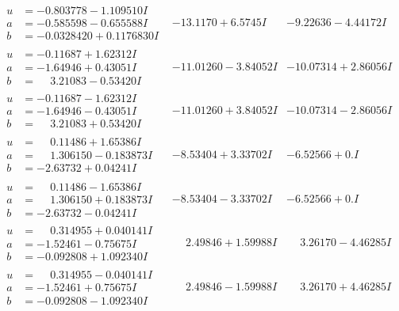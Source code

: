 \documentclass[1p]{elsarticle_modified}
\theoremstyle{definition}
\begin{document}
$$\begin{array}{c|c|c}
\begin{aligned}
u &= -0.803778 - 1.109510 I \\
a &= -0.585598 - 0.655588 I \\
b &= -0.0328420 + 0.1176830 I\end{aligned}
 & -13.1170 + 6.5745 I & -9.22636 - 4.44172 I \\ \hline\begin{aligned}
u &= -0.11687 + 1.62312 I \\
a &= -1.64946 + 0.43051 I \\
b &= \phantom{-}3.21083 - 0.53420 I\end{aligned}
 & -11.01260 - 3.84052 I & -10.07314 + 2.86056 I \\ \hline\begin{aligned}
u &= -0.11687 - 1.62312 I \\
a &= -1.64946 - 0.43051 I \\
b &= \phantom{-}3.21083 + 0.53420 I\end{aligned}
 & -11.01260 + 3.84052 I & -10.07314 - 2.86056 I \\ \hline\begin{aligned}
u &= \phantom{-}0.11486 + 1.65386 I \\
a &= \phantom{-}1.306150 - 0.183873 I \\
b &= -2.63732 + 0.04241 I\end{aligned}
 & -8.53404 + 3.33702 I & -6.52566 + 0. I\phantom{ +0.000000I} \\ \hline\begin{aligned}
u &= \phantom{-}0.11486 - 1.65386 I \\
a &= \phantom{-}1.306150 + 0.183873 I \\
b &= -2.63732 - 0.04241 I\end{aligned}
 & -8.53404 - 3.33702 I & -6.52566 + 0. I\phantom{ +0.000000I} \\ \hline\begin{aligned}
u &= \phantom{-}0.314955 + 0.040141 I \\
a &= -1.52461 - 0.75675 I \\
b &= -0.092808 + 1.092340 I\end{aligned}
 & \phantom{-}2.49846 + 1.59988 I & \phantom{-}3.26170 - 4.46285 I \\ \hline\begin{aligned}
u &= \phantom{-}0.314955 - 0.040141 I \\
a &= -1.52461 + 0.75675 I \\
b &= -0.092808 - 1.092340 I\end{aligned}
 & \phantom{-}2.49846 - 1.59988 I & \phantom{-}3.26170 + 4.46285 I \\ \hline\begin{aligned}

\end{aligned}
\end{array}$$
\end{document}
